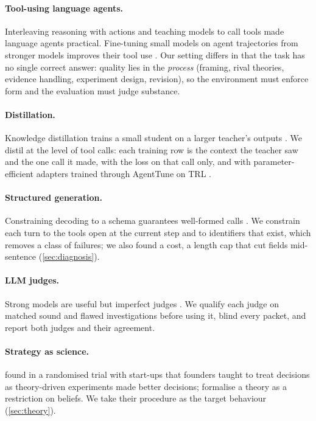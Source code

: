\paragraph{Tool-using language agents.} Interleaving reasoning with actions \citep{yao2023react} and teaching models to
call tools \citep{schick2023toolformer} made language agents practical. Fine-tuning small models on agent trajectories
from stronger models improves their tool use \citep{chen2023fireact,zeng2023agenttuning}. Our setting differs in that the
task has no single correct answer: quality lies in the \emph{process} (framing, rival theories, evidence handling,
experiment design, revision), so the environment must enforce form and the evaluation must judge substance.

\paragraph{Distillation.} Knowledge distillation trains a small student on a larger teacher's outputs
\citep{hinton2015distilling}. We distil at the level of tool calls: each training row is the context the teacher saw and
the one call it made, with the loss on that call only, and with parameter-efficient adapters \citep{hu2022lora,peft}
trained through AgentTune \citep{agenttune} on TRL \citep{trl}.

\paragraph{Structured generation.} Constraining decoding to a schema guarantees well-formed calls
\citep{willard2023outlines}. We constrain each turn to the tools open at the current step and to identifiers that exist,
which removes a class of failures; we also found a cost, a length cap that cut fields mid-sentence (\cref{sec:diagnosis}).

\paragraph{LLM judges.} Strong models are useful but imperfect judges \citep{zheng2023judging}. We qualify each judge on
matched sound and flawed investigations before using it, blind every packet, and report both judges and their agreement.

\paragraph{Strategy as science.} \citet{camuffo2020scientific} found in a randomised trial with start-ups that founders
taught to treat decisions as theory-driven experiments made better decisions; \citet{camuffo2024theory} formalise a
theory as a restriction on beliefs. We take their procedure as the target behaviour (\cref{sec:theory}).
